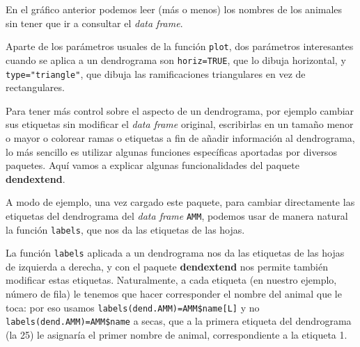 \documentclass[
]{book}
\newenvironment{Shaded}{\begin{snugshade}}{\end{snugshade}}
\newcommand{\CommentTok}[1]{\textcolor[rgb]{0.56,0.35,0.01}{\textit{#1}}}
\newcommand{\KeywordTok}[1]{\textcolor[rgb]{0.13,0.29,0.53}{\textbf{#1}}}
\newcommand{\NormalTok}[1]{#1}
\newcommand{\OperatorTok}[1]{\textcolor[rgb]{0.81,0.36,0.00}{\textbf{#1}}}
\theoremstyle{definition}
\theoremstyle{definition}
\theoremstyle{definition}
\theoremstyle{remark}
\begin{document}
En el gráfico anterior podemos leer (más o menos) los nombres de los animales sin tener que ir a consultar el \emph{data frame}.

Aparte de los parámetros usuales de la función \texttt{plot}, dos parámetros interesantes cuando se aplica a un dendrograma son \texttt{horiz=TRUE}, que lo dibuja horizontal, y \texttt{type="triangle"}, que dibuja las ramificaciones triangulares en vez de rectangulares.

Para tener más control sobre el aspecto de un dendrograma, por ejemplo cambiar sus etiquetas sin modificar el \emph{data frame} original, escribirlas en un tamaño menor o mayor o colorear ramas o etiquetas a fin de añadir información al dendrograma, lo más sencillo es utilizar algunas funciones específicas aportadas por diversos paquetes. Aquí vamos a explicar algunas funcionalidades del paquete \textbf{dendextend}.

A modo de ejemplo, una vez cargado este paquete, para cambiar directamente las etiquetas del dendrograma del \emph{data frame} \texttt{AMM}, podemos usar de manera natural la función \texttt{labels}, que nos da las etiquetas de las hojas.

\begin{Shaded}
\end{Shaded}

La función \texttt{labels} aplicada a un dendrograma nos da las etiquetas de las hojas de izquierda a derecha, y con el paquete \textbf{dendextend} nos permite también modificar estas etiquetas. Naturalmente, a cada etiqueta (en nuestro ejemplo, número de fila) le tenemos que hacer corresponder el nombre del animal que le toca: por eso usamos \texttt{labels(dend.AMM)=AMM\$name{[}L{]}} y no \texttt{labels(dend.AMM)=AMM\$name} a secas, que a la primera etiqueta del dendrograma (la 25) le asignaría el primer nombre de animal, correspondiente a la etiqueta 1.
\end{document}

